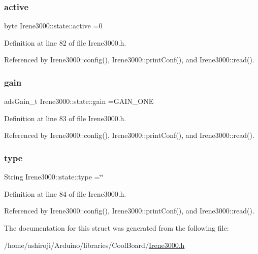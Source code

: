 \subsubsection{\texorpdfstring{active}{active}}
{\footnotesize\ttfamily byte Irene3000\+::state\+::active =0}



Definition at line 82 of file Irene3000.\+h.



Referenced by Irene3000\+::config(), Irene3000\+::print\+Conf(), and Irene3000\+::read().

\mbox{\label{structIrene3000_1_1state_a1ecf69d38cb31ecaf6b3602a3f3e93cb}} 
\subsubsection{\texorpdfstring{gain}{gain}}
{\footnotesize\ttfamily ads\+Gain\+\_\+t Irene3000\+::state\+::gain =G\+A\+I\+N\+\_\+\+O\+NE}



Definition at line 83 of file Irene3000.\+h.



Referenced by Irene3000\+::config(), Irene3000\+::print\+Conf(), and Irene3000\+::read().

\mbox{\label{structIrene3000_1_1state_a9897a7e02727db6351d44006eec73799}} 
\subsubsection{\texorpdfstring{type}{type}}
{\footnotesize\ttfamily String Irene3000\+::state\+::type =\char`\"{}\char`\"{}}



Definition at line 84 of file Irene3000.\+h.



Referenced by Irene3000\+::config(), Irene3000\+::print\+Conf(), and Irene3000\+::read().



The documentation for this struct was generated from the following file\+:\begin{DoxyCompactItemize}
\item 
/home/ashiroji/\+Arduino/libraries/\+Cool\+Board/\hyperlink{Irene3000_8h}{Irene3000.\+h}\end{DoxyCompactItemize}
